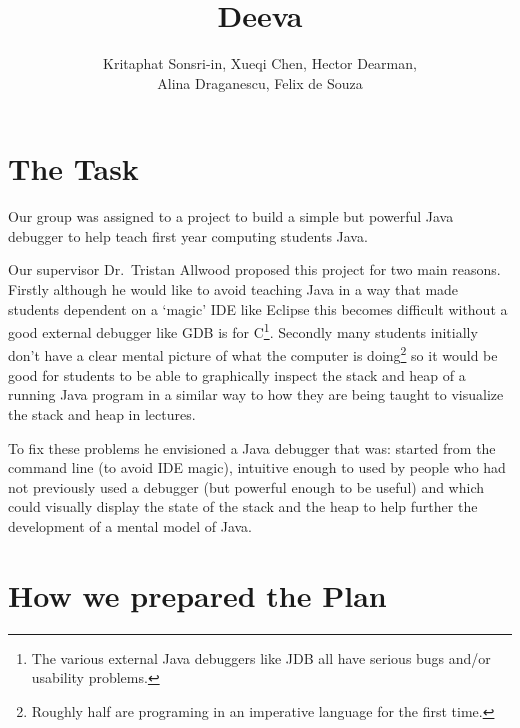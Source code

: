 \documentclass[11pt]{article}
\newcommand{\subtitle}[1]{%
  \posttitle{%
    \par\end{center}
    \begin{center}\large#1\end{center}
    \vskip0.5em}%
}
\begin{document}
\title{Deeva}
\subtitle{Planning Report}
\author{Kritaphat Sonsri-in, Xueqi Chen, Hector Dearman, \\Alina Draganescu, Felix de Souza}

\maketitle

\section{The Task}
Our group was assigned to a project to build a simple but powerful Java debugger to help teach first year computing students Java.

Our supervisor Dr.~Tristan Allwood proposed this project for two main reasons.
Firstly although he would like to avoid teaching Java in a way that made students dependent on a `magic' IDE like Eclipse this becomes difficult without a good external debugger like GDB is for C\footnote{The various external Java debuggers like JDB all have serious bugs and/or usability problems.}.
Secondly many students initially don't have a clear mental picture of what the computer is doing\footnote{Roughly half are programing in an imperative language for the first time.} so it would be good for students to be able to graphically inspect the stack and heap of a running Java program in a similar way to how they are being taught to visualize the stack and heap in lectures.

To fix these problems he envisioned a Java debugger that was: started from the command line (to avoid IDE magic), intuitive enough to used by people who had not previously used a debugger (but powerful enough to be useful) and which could visually display the state of the stack and the heap to help further the development of a mental model of Java.


\section{How we prepared the Plan}
\end{document}
